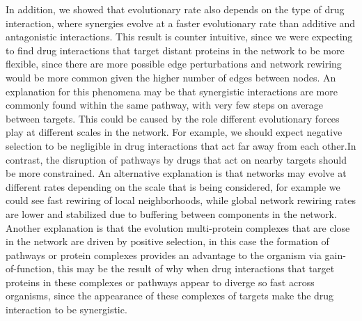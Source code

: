 \documentclass[
]{article}
\begin{document}
In addition, we showed that evolutionary rate also depends on the type of drug interaction, where synergies evolve at a faster evolutionary rate than additive and antagonistic interactions. This result is counter intuitive, since we were expecting to find drug interactions that target distant proteins in the network to be more flexible, since there are more possible edge perturbations and network rewiring would be more common given the higher number of edges between nodes.
An explanation for this phenomena may be that synergistic interactions are more commonly found within the same pathway, with very few steps on average between targets. This could be caused by the role different evolutionary forces play at different scales in the network. For example, we should expect negative selection to be negligible in drug interactions that act far away from each other.In contrast, the disruption of pathways by drugs that act on nearby targets should be more constrained. An alternative explanation is that networks may evolve at different rates depending on the scale that is being considered, for example we could see fast rewiring of local neighborhoods, while global network rewiring rates are lower and stabilized due to buffering between components in the network. Another explanation is that the evolution multi-protein complexes that are close in the network are driven by positive selection, in this case the formation of pathways or protein complexes provides an advantage to the organism via gain-of-function, this may be the result of why when drug interactions that target proteins in these complexes or pathways appear to diverge so fast across organisms, since the appearance of these complexes of targets make the drug interaction to be synergistic.
\end{document}
